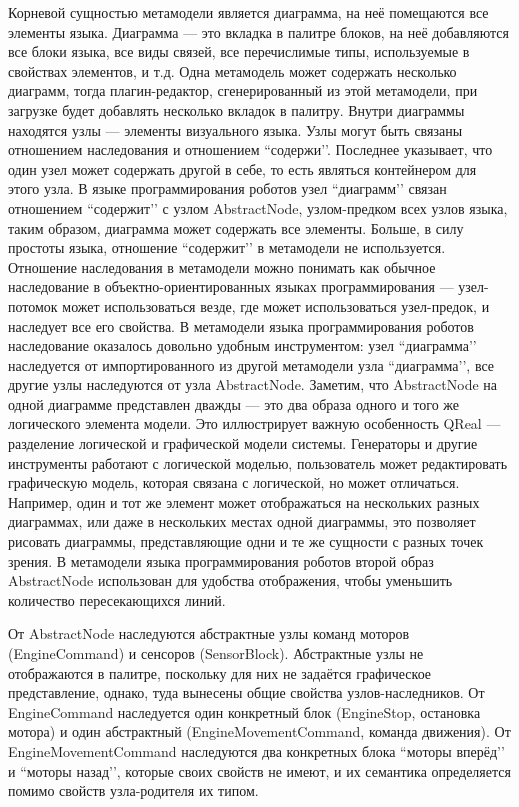 \documentclass[a4paper]{article}
\begin{document}
{Корневой сущностью метамодели является диаграмма, на неё помещаются все элементы языка. Диаграмма --- это вкладка в палитре блоков, на неё добавляются все блоки языка, все виды связей, все перечислимые типы, используемые в свойствах элементов, и т.д. Одна метамодель может содержать несколько диаграмм, тогда плагин-редактор, сгенерированный из этой метамодели, при загрузке будет добавлять несколько вкладок в палитру. Внутри диаграммы находятся узлы --- элементы визуального языка. Узлы могут быть связаны отношением наследования и отношением ``содержи’’. Последнее указывает, что один узел может содержать другой в себе, то есть являться контейнером для этого узла. В языке программирования роботов узел ``диаграмм’’ связан отношением ``содержит’’ с узлом AbstractNode, узлом-предком всех узлов языка, таким образом, диаграмма может содержать все элементы. Больше, в силу простоты языка, отношение ``содержит’’ в метамодели не используется. Отношение наследования в метамодели можно понимать как обычное наследование в объектно-ориентированных языках программирования --- узел-потомок может использоваться везде, где может использоваться узел-предок, и наследует все его свойства. В метамодели языка программирования роботов наследование оказалось довольно удобным инструментом: узел ``диаграмма’’ наследуется от импортированного из другой метамодели узла ``диаграмма’’, все другие узлы наследуются от узла AbstractNode. Заметим, что AbstractNode на одной диаграмме представлен дважды --- это два образа одного и того же логического элемента модели. Это иллюстрирует важную особенность QReal --- разделение логической и графической модели системы. Генераторы и другие инструменты работают с логической моделью, пользователь может редактировать графическую модель, которая связана с логической, но может отличаться. Например, один и тот же элемент может отображаться на нескольких разных диаграммах, или даже в нескольких местах одной диаграммы, это позволяет рисовать диаграммы, представляющие одни и те же сущности с разных точек зрения. В метамодели языка программирования роботов второй образ AbstractNode использован для удобства отображения, чтобы уменьшить количество пересекающихся линий.

От AbstractNode наследуются абстрактные узлы команд моторов (EngineCommand) и сенсоров (SensorBlock). Абстрактные узлы не отображаются в палитре, поскольку для них не задаётся графическое представление, однако, туда вынесены общие свойства узлов-наследников. От EngineCommand наследуется один конкретный блок (EngineStop, остановка мотора) и один абстрактный (EngineMovementCommand, команда движения). От EngineMovementCommand наследуются два конкретных блока ``моторы вперёд’’ и ``моторы назад’’, которые своих свойств не имеют, и их семантика определяется помимо свойств узла-родителя их типом. 

}
\end{document}
